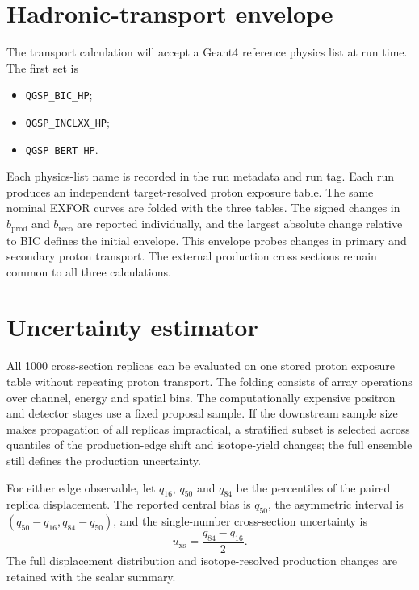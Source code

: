 \documentclass[11pt]{article}
\newcommand{\file}[1]{\texttt{#1}}
\begin{document}
\section{Hadronic-transport envelope}

The transport calculation will accept a Geant4 reference physics list at run
time.  The first set is
\begin{itemize}[nosep]
  \item \file{QGSP\_BIC\_HP};
  \item \file{QGSP\_INCLXX\_HP};
  \item \file{QGSP\_BERT\_HP}.
\end{itemize}
Each physics-list name is recorded in the run metadata and run tag.  Each run
produces an independent target-resolved proton exposure table.  The same
nominal EXFOR curves are folded with the three tables.  The signed changes in
$b_{\mathrm{prod}}$ and $b_{\mathrm{reco}}$ are reported individually, and
the largest absolute change relative to BIC defines the initial envelope.
This envelope probes changes in primary and secondary proton transport.  The
external production cross sections remain common to all three calculations.

\section{Uncertainty estimator}

All 1000 cross-section replicas can be evaluated on one stored proton exposure
table without repeating proton transport.  The folding consists of array
operations over channel, energy and spatial bins.  The computationally
expensive positron and detector stages use a fixed proposal sample.  If the
downstream sample size makes propagation of all replicas impractical, a
stratified subset is selected across quantiles of the production-edge shift
and isotope-yield changes; the full ensemble still defines the production
uncertainty.

For either edge observable, let $q_{16}$, $q_{50}$ and $q_{84}$ be the
percentiles of the paired replica displacement.  The reported central bias is
$q_{50}$, the asymmetric interval is $(q_{50}-q_{16},q_{84}-q_{50})$, and the
single-number cross-section uncertainty is
\begin{equation}
  u_{\mathrm{xs}}=\frac{q_{84}-q_{16}}{2}.
  \label{eq:uncertainty}
\end{equation}
The full displacement distribution and isotope-resolved production changes are
retained with the scalar summary.
\end{document}
